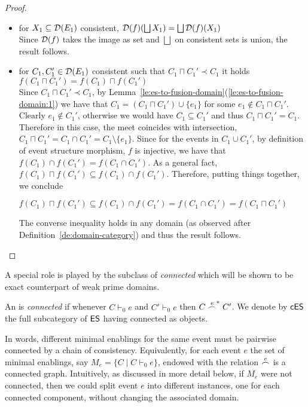 \begin{proof}
\begin{itemize}
  \item for $X_1 \subseteq \mathcal{D}({{E}_1})$ consistent, $\mathcal{D}({f})(\bigsqcup X_1) = \bigsqcup \mathcal{D}({f})(X_1)$\\
    Since $\mathcal{D}({f})$ takes the image as set and $\bigsqcup$ on
    consistent sets is union, the result follows.\\

  \item for $C_1, C_1' \in \mathcal{D}({{E}_1})$ consistent such that
    $C_1 \sqcap C_1' \prec C_1$ it holds
    $f(C_1 \sqcap C_1') = f(C_1) \sqcap f(C_1')$\\
    Since $C_1 \sqcap C_1' \prec C_1$, by
      Lemma~\ref{le:es-to-fusion-domain}(\ref{le:es-to-fusion-domain:1})
      we have that $C_ 1 = (C_1 \sqcap C_1') \cup \{ e_1 \}$ for some
      $e_1 \not\in C_1 \sqcap C_1'$.
    Clearly $e_1 \not\in C_1'$, otherwise we would have $C_1 \subseteq C_1'$
    and thus $C_1 \sqcap C_1' = C_1$. Therefore in this case, the meet
    coincides with intersection,
    $C_1 \sqcap C_1' = C_1 \cap C_1' = C_1 \setminus \{ e_1 \}$.
    Since for the events in $C_1 \cup C_1'$, by definition of event
    structure morphism, $f$ is injective, we have that
    $f(C_1) \cap f(C_1') = f(C_1 \cap C_1')$.
    As a general fact,
    $f(C_1) \sqcap f(C_1') \subseteq f(C_1) \cap f(C_1')$. Therefore,
    putting things together, we conclude
    \begin{center}
      $f(C_1) \sqcap f(C_1') \subseteq f(C_1) \cap f(C_1') = f(C_1
      \cap C_1') = f(C_1 \sqcap C_1')$
    \end{center}
    The converse inequality holds in any domain (as observed after
    Definition~\ref{de:domain-category}) and thus the result follows.
  \end{itemize}
\end{proof}


A special role is played by the subclass of \emph{connected} {\esabbr}
which will be shown to be exact counterpart of weak prime domains.


\begin{definition}
  \label{de:connected-es}
  An {\esabbr} is \emph{connected} if whenever
  $C \vdash_0 e$ and $C' \vdash_0 e$ then $C \stackrel{e}{\frown}^* C'$.  We
  denote by $\mathsf{cES}$ the full subcategory of $\mathsf{ES}$ having connected {\esabbr}
  as objects.
\end{definition}

In words, different minimal enablings for the same event must be
pairwise connected by a chain of consistency. Equivalently, for each
event $e$ the set of minimal enablings, say
$M_e = \{ C \mid C \vdash_0 e \}$, endowed with the relation
$\stackrel{e}{\frown}$ is a connected graph. Intuitively, as discussed in more
detail below, if $M_e$ were not connected, then we could split event
$e$ into different instances, one for each connected component,
without changing the associated domain.

